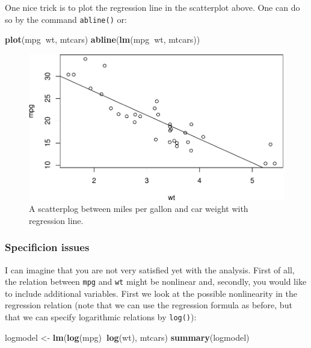 \documentclass[]{article}
\newenvironment{Shaded}{\begin{snugshade}}{\end{snugshade}}
\newcommand{\KeywordTok}[1]{\textcolor[rgb]{0.13,0.29,0.53}{\textbf{#1}}}
\newcommand{\StringTok}[1]{\textcolor[rgb]{0.31,0.60,0.02}{#1}}
\newcommand{\OperatorTok}[1]{\textcolor[rgb]{0.81,0.36,0.00}{\textbf{#1}}}
\newcommand{\NormalTok}[1]{#1}
\theoremstyle{definition}
\theoremstyle{definition}
\theoremstyle{definition}
\theoremstyle{remark}
\begin{document}
One nice trick is to plot the regression line in the scatterplot above.
One can do so by the command \texttt{abline()} or:

\begin{Shaded}
\begin{Highlighting}[]
\KeywordTok{plot}\NormalTok{(mpg}\OperatorTok{~}\NormalTok{wt, mtcars)}
\KeywordTok{abline}\NormalTok{(}\KeywordTok{lm}\NormalTok{(mpg}\OperatorTok{~}\NormalTok{wt, mtcars))}
\end{Highlighting}
\end{Shaded}

\begin{figure}
\centering
\includegraphics{./unnamed-chunk-36-1.pdf}
\caption{\label{fig:unnamed-chunk-36}A scatterplog between miles per gallon
and car weight with regression line.}
\end{figure}

\subsubsection{Specificion issues}\label{specificion-issues}

I can imagine that you are not very satisfied yet with the analysis.
First of all, the relation between \texttt{mpg} and \texttt{wt} might be
nonlinear and, secondly, you would like to include additional variables.
First we look at the possible nonlinearity in the regression relation
(note that we can use the regression formula as before, but that we can
specify logarithmic relations by \texttt{log()}):

\begin{Shaded}
\begin{Highlighting}[]
\NormalTok{logmodel <-}\StringTok{ }\KeywordTok{lm}\NormalTok{(}\KeywordTok{log}\NormalTok{(mpg)}\OperatorTok{~}\KeywordTok{log}\NormalTok{(wt), mtcars)}
\KeywordTok{summary}\NormalTok{(logmodel)}
\end{Highlighting}
\end{Shaded}
\end{document}
